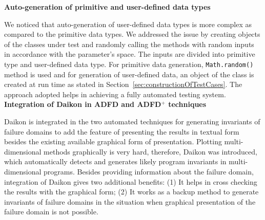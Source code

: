 \textbf{Auto-generation of primitive and user-defined data types}

We noticed that auto-generation of user-defined data types is more complex as compared to the primitive data types. We addressed the issue by creating objects of the classes under test and randomly calling the methods with random inputs in accordance with the parameter's space. The inputs are divided into primitive type and user-defined data type.  For primitive data generation, \verb+Math.random()+ method is used and for generation of user-defined data, an object of the class is created at run time as stated in Section~\ref{sec:constructionOfTestCases}. The approach adopted helps in achieving a fully automated testing system.\\








\textbf{Integration of Daikon in ADFD and ADFD$^+$ techniques}

Daikon is integrated in the two automated techniques for generating invariants of failure domains to add the feature of  presenting the results in textual form besides the existing available graphical form of presentation. Plotting multi-dimensional methods graphically is very hard, therefore, Daikon was introduced, which automatically detects and generates likely program invariants in multi-dimensional programs. Besides providing information about the failure domain, integration of Daikon gives two additional benefits: (1) It helps in cross checking the results with the graphical form; (2) It works as a backup method to generate invariants of failure domains in the situation when graphical presentation of the failure domain is not possible. \\
\clearpage



